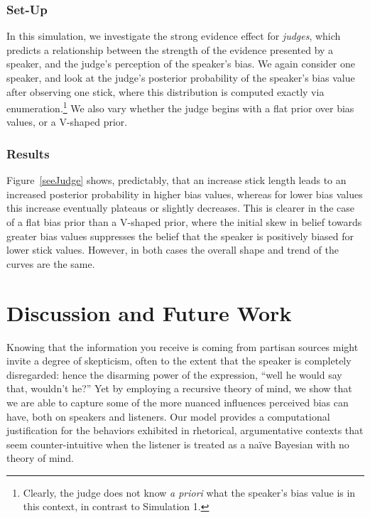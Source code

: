 \documentclass[10pt,letterpaper]{article}
\begin{document}
\subsubsection{Set-Up}
In this simulation, we investigate the strong evidence effect for \textit{judges}, which predicts a relationship between 
the strength of the evidence presented by a speaker, and the judge's perception of the speaker's bias.
We again consider one speaker, and look at the judge's posterior probability of the speaker's bias value after 
observing one stick, where this distribution is computed exactly via enumeration.\footnote{Clearly, the judge does 
not know \textit{a priori} what the speaker's bias value is in this context, in contrast to Simulation 1.} We also vary 
whether the judge begins with a flat prior over bias values, or a V-shaped prior.

\subsubsection{Results}

Figure~\ref{seeJudge} shows, predictably, that an increase stick length leads to an increased posterior probability in
higher bias values, whereas for lower bias values this increase eventually plateaus or slightly decreases. This is clearer 
in the case of a flat bias prior than a V-shaped prior, where the initial skew in belief towards greater bias values suppresses
the belief that the speaker is positively biased for lower stick values. However, in both cases the overall shape and trend 
of the curves are the same.



\section{Discussion and Future Work}


Knowing that the information you receive is coming from partisan sources might invite a degree of skepticism, often to
the extent that the speaker is completely disregarded: hence the disarming power of the expression, 
``well he would say that, wouldn't he?''  Yet by employing a recursive theory of
mind, we show that we are able to capture some of the more nuanced influences perceived bias can have,
both on speakers and listeners. Our model provides a computational justification for the 
behaviors exhibited in rhetorical, argumentative contexts that seem counter-intuitive when the listener is
treated as a na\"ive Bayesian with no theory of mind.
\end{document}
